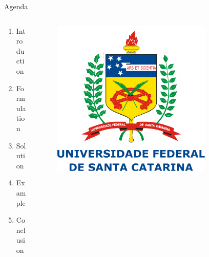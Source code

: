 \documentclass{beamer}
\begin{document}
\capa



\begin{frame}{Agenda}
    \begin{columns}[c]
        \begin{column}{.5\textwidth}
    
    	\begin{enumerate}
            \item Introduction
            \item Formulation
            \item Solution
            \item Example
            \item Conclusion
        \end{enumerate}
    
        \end{column}
        \begin{column}{.5\textwidth}
    
    	\begin{figure}[h]
    	    \centering
    	    \includegraphics[width=0.8\textwidth]{UFSC.pdf}
    	\end{figure}
    
        \end{column}
    \end{columns}
\end{frame}
\end{document}
